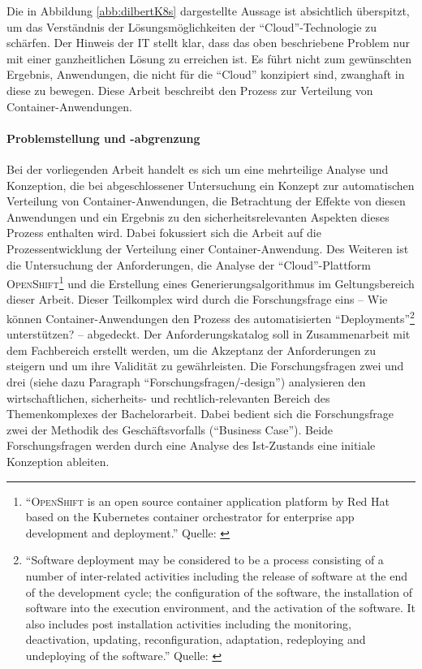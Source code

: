 Die in Abbildung \vref{abb:dilbertK8s} dargestellte Aussage ist absichtlich überspitzt, um das Verständnis der Lösungsmöglichkeiten der \enquote{Cloud}-Technologie zu schärfen. Der Hinweis der IT stellt klar, dass das oben beschriebene Problem nur mit einer ganzheitlichen Lösung zu erreichen ist. Es führt nicht zum gewünschten Ergebnis, Anwendungen, die nicht für die \enquote{Cloud} konzipiert sind, zwanghaft in diese zu bewegen. Diese Arbeit beschreibt den Prozess zur Verteilung von Container-Anwendungen. 

\paragraph{Problemstellung und -abgrenzung}
Bei der vorliegenden Arbeit handelt es sich um eine mehrteilige Analyse und Konzeption, die bei abgeschlossener Untersuchung ein Konzept zur automatischen Verteilung von Container-Anwendungen, die Betrachtung der Effekte von diesen Anwendungen und ein Ergebnis zu den sicherheitsrelevanten Aspekten dieses Prozess enthalten wird. Dabei fokussiert sich die Arbeit auf die Prozessentwicklung der Verteilung einer Container-Anwendung. Des Weiteren ist die Untersuchung der Anforderungen, die Analyse der \enquote{Cloud}-Plattform \textsc{OpenShift}\footnote{\enquote{\textsc{OpenShift} is an open source container application platform by Red Hat based on the Kubernetes container orchestrator for enterprise app development and deployment.} Quelle: \cite[][]{red_hat_inc_openshift_2020}} und die Erstellung eines Generierungsalgorithmus im Geltungsbereich dieser Arbeit. Dieser Teilkomplex wird durch die Forschungsfrage eins -- Wie können Container-Anwendungen den Prozess des automatisierten \enquote{Deployments}\footnote{\enquote{Software deployment may be considered to be a process consisting of a number of inter-related activities including the release of software at the end of the development cycle; the configuration of the software, the installation of software into the execution environment, and the activation of the software. It also includes post installation activities including the monitoring, deactivation, updating, reconfiguration, adaptation, redeploying and undeploying of the software.} Quelle: \cite{dearle_software_2007}} unterstützen? -- abgedeckt. Der Anforderungskatalog soll in Zusammenarbeit mit dem Fachbereich erstellt werden, um die Akzeptanz der Anforderungen zu steigern und um ihre Validität zu gewährleisten. Die Forschungsfragen zwei und drei (siehe dazu Paragraph \enquote{Forschungsfragen/-design}) analysieren den wirtschaftlichen, sicherheits- und rechtlich-relevanten Bereich des Themenkomplexes der Bachelorarbeit. Dabei bedient sich die Forschungsfrage zwei der Methodik des Geschäftsvorfalls (\enquote{Business Case}). Beide Forschungsfragen werden durch eine Analyse des Ist-Zustands eine initiale Konzeption ableiten. 
